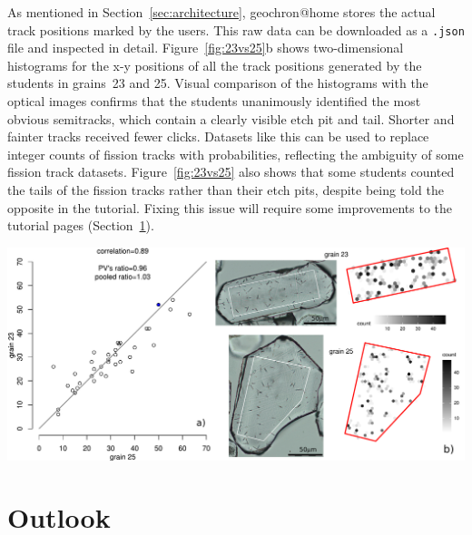 \documentclass[gchron, manuscript]{copernicus}
\begin{document}
As mentioned in Section~\ref{sec:architecture}, geochron@home stores
the actual track positions marked by the users. This raw data can be
downloaded as a \texttt{.json} file and inspected in detail.
Figure~\ref{fig:23vs25}b shows two-dimensional histograms for the x-y
positions of all the track positions generated by the students in
grains~23 and 25. Visual comparison of the histograms with the optical
images confirms that the students unanimously identified the most
obvious semitracks, which contain a clearly visible etch pit and
tail. Shorter and fainter tracks received fewer clicks. Datasets like
this can be used to replace integer counts of fission tracks with
probabilities, reflecting the ambiguity of some fission track
datasets. Figure~\ref{fig:23vs25} also shows that some students
counted the tails of the fission tracks rather than their etch pits,
despite being told the opposite in the tutorial. Fixing this issue
will require some improvements to the tutorial pages
(Section~\ref{sec:outlook}).\medskip

{ \centering \includegraphics[width=15cm]{23vs25.pdf}
  \label{fig:23vs25}
}%

\section{Outlook}\label{sec:outlook}
\end{document}
